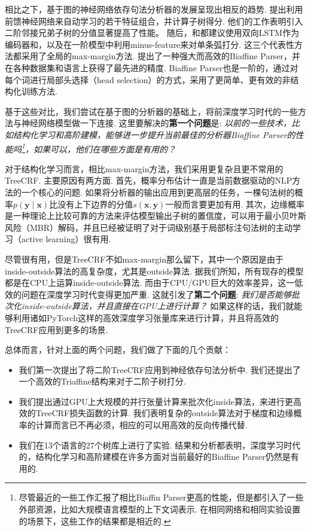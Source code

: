 相比之下，基于图的神经网络依存句法分析器的发展呈现出相反的趋势.
\cite{pei-etal-2015-effective}提出利用前馈神经网络来自动学习\cite{chen-manning-2014-fast}的若干特征组合，并计算子树得分.
他们的工作表明引入二阶邻接兄弟子树的分值显著提高了性能。
随后，\cite{wang-chang-2016-graph}和\cite{kiperwasser-goldberg-2016-simple}都建议使用双向LSTM作为编码器和，以及在一阶模型中利用minus-feature来对单条弧打分.
这三个代表性方法都采用了全局的max-margin方法.
\cite{dozat-etal-2017-biaffine}提出了一种强大而高效的Biaffine Parser，并在各种数据集和语言上获得了最先进的精度.
Biaffine Parser也是一阶的，通过对每个词进行局部头选择（head selection）的方式\cite{zhang-etal-2017-dependency-parsing}，采用了更简单、更有效的非结构化训练方法.

基于这些对比，我们尝试在基于图的分析器的基础上，将前深度学习时代的一些方法与神经网络模型做一下连接.
这里要解决的\textbf{第一个问题}是:
\emph{以前的一些技术，比如结构化学习和高阶建模，能够进一步提升当前最佳的分析器Biaffine Parser的性能吗\footnote{
        尽管最近的一些工作汇报了相比Biaffin Parser更高的性能，但是都引入了一些外部资源，比如大规模语言模型的上下文词表示. 在相同网络和相同实验设置的场景下，这些工作的结果都是相近的.
    }，如果可以，他们在哪些方面是有用的？}

对于结构化学习而言，相比max-margin方法，我们采用更复杂且更不常用的TreeCRF.
主要原因有两方面.
首先，概率分布估计一直是当前数据驱动的NLP方法的一个核心的问题\cite{le-zuidema-2014-inside}.
如果将分析器的输出应用到更高层的任务，一棵句法树的概率$p(\boldsymbol{y}\mid\boldsymbol{x})$比没有上下边界的分值$s (\boldsymbol{x},\boldsymbol{y})$一般而言要更加有用.
其次，边缘概率是一种理论上比较可靠的方法来评估模型输出子树的置信度，可以用于最小贝叶斯风险（MBR）解码\cite{smith-smith-2007-probabilistic}，并且已经被证明了对于词级别基于局部标注句法树的主动学习（active learning）\cite{li-etal-2016-active}很有用.

尽管很有用，但是TreeCRF不如max-margin那么留下，其中一个原因是由于inside-outside算法的高复杂度，尤其是outside算法.
据我们所知，所有现存的模型都是在CPU上运算inside-outside算法.
而由于CPU/GPU巨大的效率差异，这一低效的问题在深度学习时代变得更加严重.
这就引发了\textbf{第二个问题}:
\emph{我们是否能够批次化inside-outside算法，并且直接在GPU上进行计算？}
如果这样的话，我们就能够利用诸如PyTorch这样的高效深度学习张量库来进行计算，并且将高效的TreeCRF应用到更多的场景\cite{cai-etal-2017-crf,le-zuidema-2014-inside}.

总体而言，针对上面的两个问题，我们做了下面的几个贡献：
\begin{itemize}%
    \item 我们第一次提出了将二阶TreeCRF应用到神经依存句法分析中.
          我们还提出了一个高效的Triaffine结构来对于二阶子树打分.
    \item 我们提出通过GPU上大规模的并行张量计算来批次化inside算法，来进行更高效的TreeCRF损失函数的计算.
          我们表明复杂的outside算法对于梯度和边缘概率的计算而言已不再必须，相应的可以用高效的反向传播代替.
    \item 我们在13个语言的27个树库上进行了实验.
          结果和分析都表明，深度学习时代的，结构化学习和高阶建模在许多方面对当前最好的Biaffine Parser仍然是有用的.
\end{itemize}

